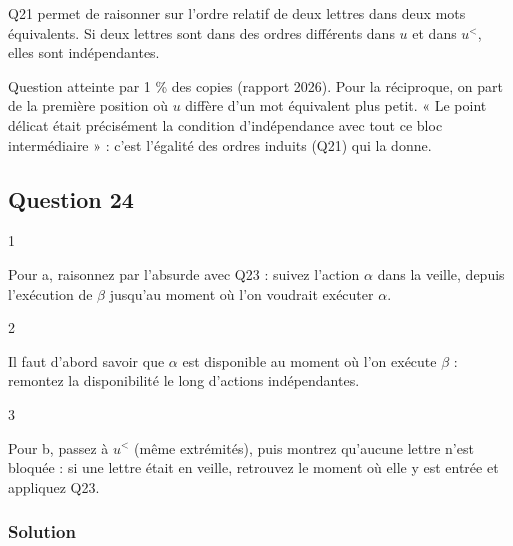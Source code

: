 \documentclass[11pt,a4paper]{article}
\begin{document}
\begin{methode}

Q21 permet de raisonner sur l'ordre relatif de deux lettres dans deux mots équivalents. Si deux lettres sont dans des ordres différents dans \(u\) et dans \(u^<\), elles sont indépendantes.

\end{methode}

\begin{jury}

Question atteinte par 1 \% des copies (rapport 2026). Pour la réciproque, on part de la première position où \(u\) diffère d'un mot équivalent plus petit. « Le point délicat était précisément la condition d'indépendance avec tout ce bloc intermédiaire » : c'est l'égalité des ordres induits (Q21) qui la donne.

\end{jury}

\hypertarget{question-24}{%
\subsection{Question 24}\label{question-24}}

\begin{indication}{1}

Pour a, raisonnez par l'absurde avec Q23 : suivez l'action \(\alpha\) dans la veille, depuis l'exécution de \(\beta\) jusqu'au moment où l'on voudrait exécuter \(\alpha\).

\end{indication}

\begin{indication}{2}

Il faut d'abord savoir que \(\alpha\) est disponible au moment où l'on exécute \(\beta\) : remontez la disponibilité le long d'actions indépendantes.

\end{indication}

\begin{indication}{3}

Pour b, passez à \(u^<\) (même extrémités), puis montrez qu'aucune lettre n'est bloquée : si une lettre était en veille, retrouvez le moment où elle y est entrée et appliquez Q23.

\end{indication}

\hypertarget{solution-23}{%
\subsubsection{Solution}\label{solution-23}}
\end{document}
